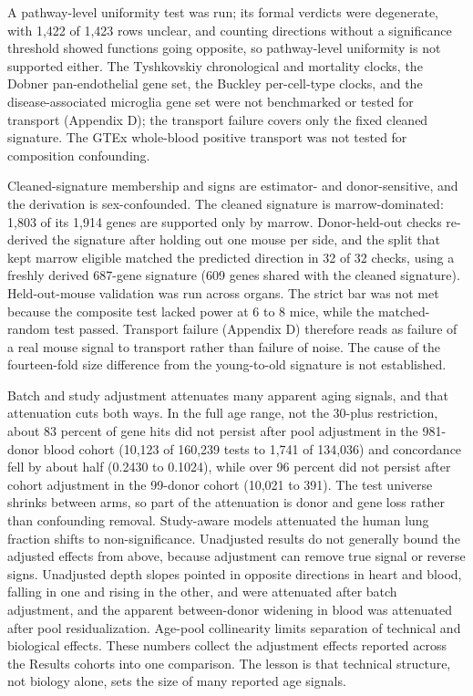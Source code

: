 \documentclass[11pt]{article}
\begin{document}
A pathway-level uniformity test was run; its formal verdicts were degenerate, with 1,422 of 1,423 rows unclear, and counting directions without a significance threshold showed functions going opposite, so pathway-level uniformity is not supported either. The Tyshkovskiy chronological and mortality clocks, the Dobner pan-endothelial gene set, the Buckley per-cell-type clocks, and the disease-associated microglia gene set were not benchmarked or tested for transport (Appendix D); the transport failure covers only the fixed cleaned signature. The GTEx whole-blood positive transport was not tested for composition confounding.

Cleaned-signature membership and signs are estimator- and donor-sensitive, and the derivation is sex-confounded. The cleaned signature is marrow-dominated: 1,803 of its 1,914 genes are supported only by marrow. Donor-held-out checks re-derived the signature after holding out one mouse per side, and the split that kept marrow eligible matched the predicted direction in 32 of 32 checks, using a freshly derived 687-gene signature (609 genes shared with the cleaned signature). Held-out-mouse validation was run across organs. The strict bar was not met because the composite test lacked power at 6 to 8 mice, while the matched-random test passed. Transport failure (Appendix D) therefore reads as failure of a real mouse signal to transport rather than failure of noise. The cause of the fourteen-fold size difference from the young-to-old signature is not established.

Batch and study adjustment attenuates many apparent aging signals, and that attenuation cuts both ways. In the full age range, not the 30-plus restriction, about 83 percent of gene hits did not persist after pool adjustment in the 981-donor blood cohort (10,123 of 160,239 tests to 1,741 of 134,036) and concordance fell by about half (0.2430 to 0.1024), while over 96 percent did not persist after cohort adjustment in the 99-donor cohort (10,021 to 391). The test universe shrinks between arms, so part of the attenuation is donor and gene loss rather than confounding removal. Study-aware models attenuated the human lung fraction shifts to non-significance. Unadjusted results do not generally bound the adjusted effects from above, because adjustment can remove true signal or reverse signs. Unadjusted depth slopes pointed in opposite directions in heart and blood, falling in one and rising in the other, and were attenuated after batch adjustment, and the apparent between-donor widening in blood was attenuated after pool residualization. Age-pool collinearity limits separation of technical and biological effects. These numbers collect the adjustment effects reported across the Results cohorts into one comparison. The lesson is that technical structure, not biology alone, sets the size of many reported age signals.
\end{document}
